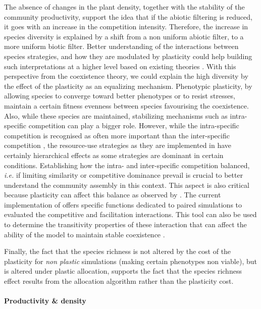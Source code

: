The absence of changes in the plant density, together with the stability of the community productivity, support the idea that if the abiotic filtering is reduced, it goes with an increase in the competition intensity. Therefore, the increase in species diversity is explained by a shift from a non uniform abiotic filter, to a more uniform biotic filter. Better understanding of the interactions between species strategies, and how they are modulated by plasticity could help building such interpretations at a higher level based on existing theories \parencite{chesson_mechanisms_2000}. 
With this perspective from the coexistence theory, we could explain the high diversity by the effect of the plasticity as an equalizing mechanism. Phenotypic plasticity, by allowing species to converge toward better phenotypes or to resist stresses, maintain a certain fitness evenness between species favourising the coexistence. Also, while these species are maintained, stabilizing mechanisms such as intra-specific competition can play a bigger role. However, while the intra-specific competition is recognised as often more important than the inter-specific competition \parencite{macarthur_limiting_1967}, the resource-use strategies as they are implemented in \model have certainly hierarchical effects \parencite{kunstler_plant_2016} as some strategies are dominant in certain conditions. Establishing how the intra- and inter-specific competition balanced, \textit{i.e.} if limiting similarity or competitive dominance prevail is crucial to better understand the community assembly in this context. This aspect is also critical because plasticity can affect this balance as observed by \citet{bennett_reciprocal_2016}. The current implementation of \model offers specific functions dedicated to paired simulations to evaluated the competitive and facilitation interactions. This tool can also be used to determine the transitivity properties of these interaction that can affect the ability of the model to maintain stable coexistence \parencite{levine_beyond_2017}. 


Finally, the fact that the species richness is not altered by the cost of the plasticity for \textit{non plastic} simulations (making certain phenotypes non viable), but is altered under plastic allocation, supports the fact that the species richness effect results from the allocation algorithm rather than the plasticity cost.


\paragraph{Productivity \& density}

